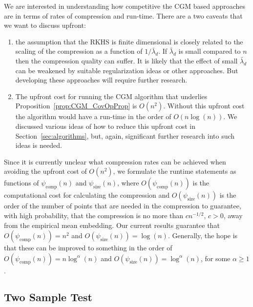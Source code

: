 \documentclass[AHL,Unicode,longabstracts,published]{cedram}
\theoremstyle{remark}
\newcommand{\compp}{\mathrm{comp}}
\newcommand{\ssize}{\mathrm{size}}
\begin{document}
We are interested in understanding how competitive the CGM based approaches are in terms of rates of compression and run-time. There are a two caveats that we want to discuss upfront: 
\begin{enumerate}
\item the assumption that the RKHS is finite dimensional is closely related to the scaling of the compression as a function of $1/\bar \lambda_d$. If $\bar \lambda_d$ is small compared to $n$ then the compression quality can suffer. It is likely that the effect of small $\bar \lambda_d$ can be weakened by suitable regularization ideas or other approaches. But developing these approaches will require further research.
\item The upfront cost for running the CGM algorithm that underlies Proposition~\ref{prop:CGM_CovOpProp} is $O(n^2)$. Without this upfront cost the algorithm would have a run-time in the order of $O(n \log(n))$. We discussed various ideas of how to reduce this upfront cost in Section~\ref{sec:algorithms}, but, again, significant further research into such ideas is needed.
\end{enumerate}

Since it is currently unclear what compression rates can be achieved when avoiding the upfront cost of $O(n^2)$, we formulate the runtime statements as functions of $\psi_{\compp}(n)$ and $\psi_{\ssize}(n)$, where $O(\psi_{\compp}(n))$ is the computational cost for calculating the compression and $O(\psi_{\ssize}(n))$ is the order of the number of points that are needed in the compression to guarantee, with high probability, that the compression is no more than $c n^{-1/2}$, $c >0$, away from the empirical mean embedding. Our current results guarantee that $O(\psi_{\compp}(n)) = n^2$ and $O(\psi_{\ssize}(n)) = \log(n)$. Generally, the hope is that these can be improved to something in the order of $O(\psi_{\compp}(n)) = n \log^\alpha(n)$ and $O(\psi_{\ssize}(n)) = \log^\alpha (n)$, for some $\alpha \geq 1$.



\subsection{Two Sample Test}
\end{document}
